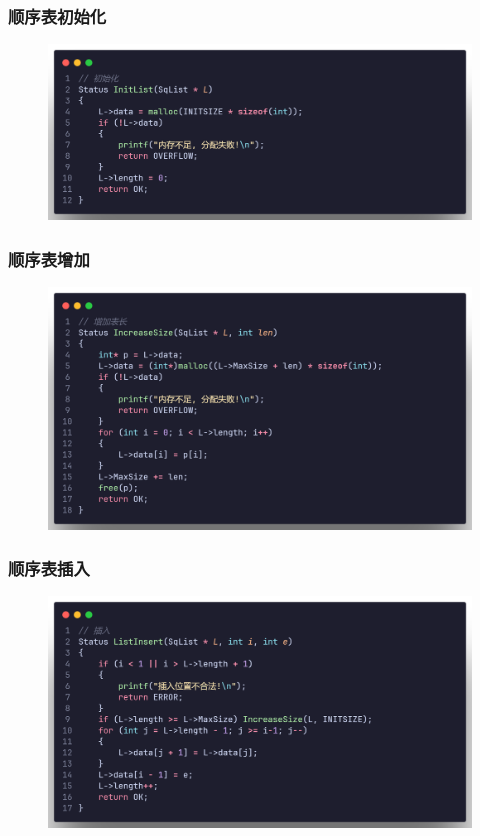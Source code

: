 \subsubsection{顺序表初始化}

\begin{figure}[H]
    \centering
    \includegraphics[scale=0.2]{"figure/Note/LinearList/SqInit.png"}
\end{figure} 

\subsubsection{顺序表增加}

\begin{figure}[H]
    \centering
    \includegraphics[scale=0.2]{"figure/Note/LinearList/SqIncrease.png"}
\end{figure} 

\subsubsection{顺序表插入}

\begin{figure}[H]
    \centering
    \includegraphics[scale=0.2]{"figure/Note/LinearList/SqInsert.png"}
\end{figure} 

